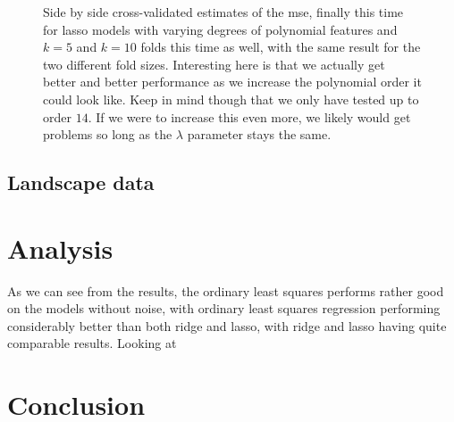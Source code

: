\documentclass{article}
\begin{document}
\begin{figure}
    \centering
    \quad
    \caption{Side by side cross-validated estimates of the mse, finally this time for lasso models with varying degrees of polynomial features and $k=5$ and
        $k=10$ folds this time as well, with the same result for the two
        different fold sizes. Interesting here is that we actually get better
        and better performance as we increase the polynomial order it could look
        like. Keep in mind though that we only have tested up to order $14$. If
        we were to increase this even more, we likely would get problems so long
        as the $\lambda$ parameter stays the same.}
    \label{crossval-lasso}
\end{figure}

\subsection{Landscape data}


\section{Analysis}
As we can see from the results, the ordinary least squares performs rather good
on the models without noise, with ordinary least squares regression performing
considerably better than both ridge and lasso, with ridge and lasso having quite
comparable results. Looking at

\section{Conclusion}
\end{document}
